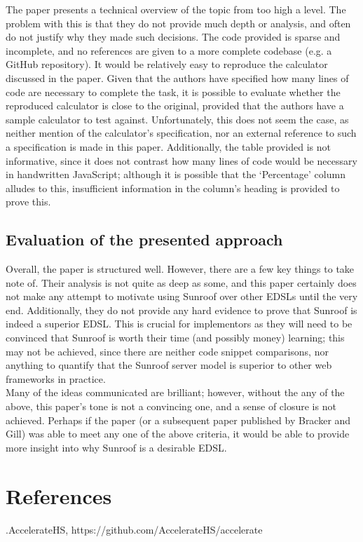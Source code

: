 \documentclass[9pt]{report}
\begin{document}
\noindent
The paper presents a technical overview of the topic from too high a level.
The problem with this is that they do not provide much depth or analysis, and often do not justify why they made such decisions.
The code provided is sparse and incomplete, and no references are given to a more complete codebase (e.g. a GitHub repository).
It would be relatively easy to reproduce the calculator discussed in the paper.
Given that the authors have specified how many lines of code are necessary to complete the task, it is possible to evaluate whether the reproduced calculator is close to the original, provided that the authors have a sample calculator to test against.
Unfortunately, this does not seem the case, as neither mention of the calculator's specification, nor an external reference to such a specification is made in this paper.
Additionally, the table provided is not informative, since it does not contrast how many lines of code would be necessary in handwritten JavaScript; although it is possible that the `Percentage' column alludes to this, insufficient information in the column's heading is provided to prove this.

\subsection*{Evaluation of the presented approach}
Overall, the paper is structured well.
However, there are a few key things to take note of.
Their analysis is not quite as deep as some, and this paper certainly does not make any attempt to motivate using Sunroof over other EDSLs until the very end.
Additionally, they do not provide any hard evidence to prove that Sunroof is indeed a superior EDSL.
This is crucial for implementors as they will need to be convinced that Sunroof is worth their time (and possibly money) learning; this may not be achieved, since there are neither code snippet comparisons, nor anything to quantify that the Sunroof server model is superior to other web frameworks in practice.\\

Many of the ideas communicated are brilliant; however, without the any of the above, this paper's tone is not a convincing one, and a sense of closure is not achieved.
Perhaps if the paper (or a subsequent paper published by Bracker and Gill) was able to meet any one of the above criteria, it would be able to provide more insight into why Sunroof is a desirable EDSL.

\section*{References}
.\hspace{5mm}AccelerateHS, https://github.com/AccelerateHS/accelerate\\
\end{document}
